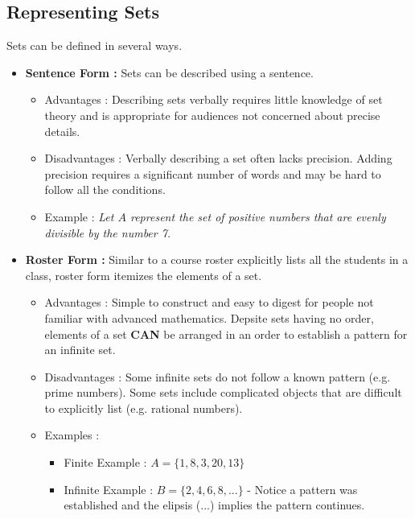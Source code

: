 \subsection*{Representing Sets}
Sets can be defined in several ways.
\begin{itemize}
    \item \textbf{Sentence Form : } Sets can be described using a sentence.
        \begin{itemize}
            \item Advantages : Describing sets verbally requires little knowledge of set theory and is appropriate for audiences not concerned about precise details. 
            \item Disadvantages : Verbally describing a set often lacks precision.  Adding precision requires a significant number of words and may be hard to follow all the conditions.
            \item Example : \emph{Let $A$ represent the set of positive numbers that are evenly divisible by the number 7.}
        \end{itemize}
    \item \textbf{Roster Form : } Similar to a course roster explicitly lists all the students in a class, roster form itemizes the elements of a set.
        \begin{itemize}
            \item Advantages : Simple to construct and easy to digest for people not familiar with advanced mathematics.  Depsite sets having no order, elements of a set \textbf{CAN} be arranged in an order to establish a pattern for an infinite set.
            \item Disadvantages : Some infinite sets do not follow a known pattern (e.g. prime numbers). Some sets include complicated objects that are difficult to explicitly list (e.g. rational numbers).
            \item Examples :  
                \begin{itemize}
                    \item Finite Example : $A = \{1,8,3,20,13\}$
                    \item Infinite Example : $B = \{2,4,6,8,...\}$ - Notice a pattern was established and the elipsis (...) implies the pattern continues.
                \end{itemize}
        \end{itemize}    
        

\end{itemize}
